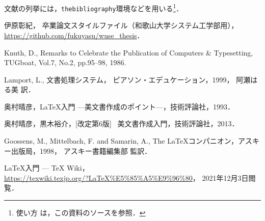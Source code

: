 \documentclass[11pt]{jreport}
\begin{document}
文献の列挙には，{\tt thebibliography}環境などを用いる\footnote{使い方
は，この資料のソースを参照．}．




\begin{thebibliography}{99}

  伊原彰紀，
  卒業論文スタイルファイル（和歌山大学システム工学部用），\\
  \url{https://github.com/fukuyasu/wuse_thesis}．

  Knuth, D.,
  Remarks to Celebrate the Publication of Computers \& Typesetting,
  TUGboat, Vol.7, No.2, pp.95--98, 1986.

  Lamport, L.,
  文書処理システム\LaTeXe{}，
  ピアソン・エデュケーション，1999，
  \newblock{}阿瀬はる美 訳．

  奥村晴彦，\LaTeX{}入門 ---美文書作成のポイント---，技術評論社，1993．

  奥村晴彦，黒木裕介，[改定第6版] \LaTeXe~美文書作成入門，技術評論社，2013．

  Goossens, M., Mittelbach, F. and Samarin, A.,
  The \LaTeX{}コンパニオン，アスキー出版局，1998，
  \newblock{}アスキー書籍編集部 監訳．

  \LaTeX 入門 --- \TeX{} Wiki，\\
  \url{https://texwiki.texjp.org/?LaTeX%E5%85%A5%E9%96%80}，
  2021年12月3日閲覧．
\end{thebibliography}


% 
% 
% 

\end{document}
